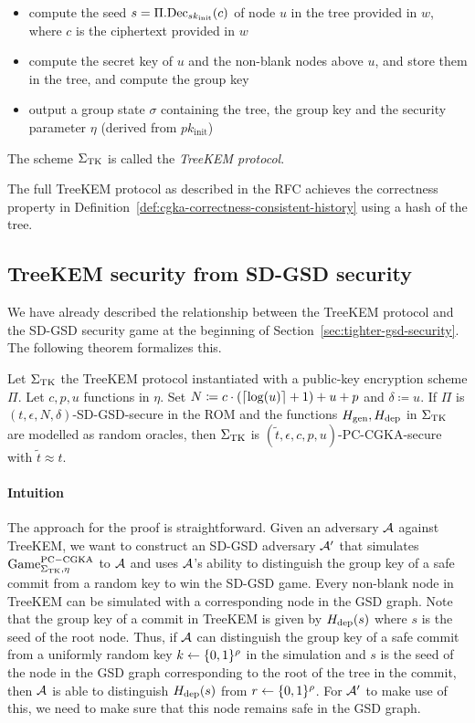 \begin{definition}
\begin{itemize}
\begin{itemize}
			      \item compute the seed $s = \Pi.\mathrm{Dec}_{sk_{\mathrm{init}}}(c)$ of node $u$ in the tree provided in $w$, where $c$ is the ciphertext provided in $w$
			      \item compute the secret key of $u$ and the non-blank nodes above $u$, and store them in the tree, and compute the group key
			      \item output a group state $\sigma$ containing the tree, the group key and the security parameter $\eta$ (derived from $pk_{\mathrm{init}}$)
		      \end{itemize}
	\end{itemize}
	The scheme $\Sigma_{\mathrm{TK}}$ is called the \emph{TreeKEM protocol}.
\end{definition}

The full TreeKEM protocol as described in the RFC achieves the correctness property in Definition~\ref{def:cgka-correctness-consistent-history} using a hash of the tree.

\subsection{TreeKEM security from SD-GSD security}

We have already described the relationship between the TreeKEM protocol and the SD-GSD security game at the beginning of Section~\ref{sec:tighter-gsd-security}. The following theorem formalizes this.

\begin{theorem} \label{theorem:cgka-from-sdgsd}
	Let $\Sigma_{\mathrm{TK}}$ the TreeKEM protocol instantiated with a public-key encryption scheme $\Pi$. Let $c, p, u$ functions in $\eta$. Set $N \coloneqq c \cdot (\lceil\log(u)\rceil + 1) + u + p$ and $\delta \coloneqq u$. If $\Pi$ is $(t, \epsilon, N, \delta)$-SD-GSD-secure in the ROM and the functions $H_\mathrm{gen}, H_\mathrm{dep}$ in $\Sigma_{\mathrm{TK}}$ are modelled as random oracles, then $\Sigma_{\mathrm{TK}}$ is $(\tilde{t}, \epsilon, c, p, u)$-PC-CGKA-secure with $\tilde{t} \approx t$.
\end{theorem}

\paragraph{Intuition} The approach for the proof is straightforward. Given an adversary $\mathcal{A}$ against TreeKEM, we want to construct an SD-GSD adversary $\mathcal{A}'$ that simulates $\mathrm{Game}_{\Sigma_{\mathrm{TK}}, \eta}^{\mathrm{PC-CGKA}}$ to $\mathcal{A}$ and uses $\mathcal{A}$'s ability to distinguish the group key of a safe commit from a random key to win the SD-GSD game. Every non-blank node in TreeKEM can be simulated with a corresponding node in the GSD graph. Note that the group key of a commit in TreeKEM is given by $H_\mathrm{dep}(s)$ where $s$ is the seed of the root node. Thus, if $\mathcal{A}$ can distinguish the group key of a safe commit from a uniformly random key $k \leftarrow \{0, 1\}^\rho$ in the simulation and $s$ is the seed of the node in the GSD graph corresponding to the root of the tree in the commit, then $\mathcal{A}$ is able to distinguish $H_\mathrm{dep}(s)$ from $r \leftarrow \{0, 1\}^\rho$. For $\mathcal{A}'$ to make use of this, we need to make sure that this node remains safe in the GSD graph.

